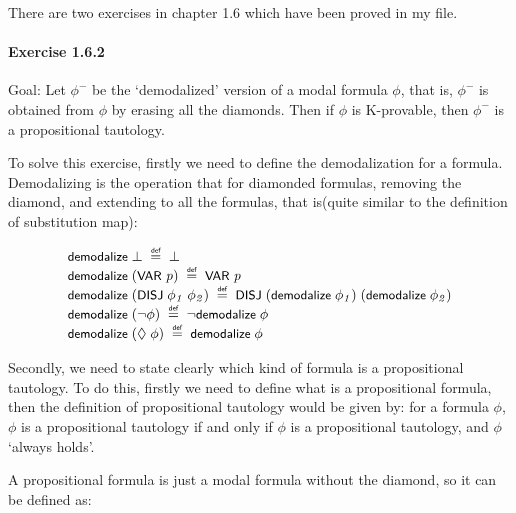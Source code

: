 \documentclass{report}
\renewcommand{\HOLConst}[1]{{\textsf{\upshape\small #1}}}
\newenvironment{holmath}{\begin{displaymath}\begin{array}{l}}{\end{array}\end{displaymath}\ignorespacesafterend}
\begin{document}
There are two exercises in chapter 1.6 which have been proved in my file.

\paragraph{Exercise 1.6.2}

Goal: Let $\phi^-$ be the `demodalized' version of a modal formula $\phi$, that is, $\phi^-$ is obtained from $\phi$ by erasing all the diamonds. Then if $\phi$ is K-provable, then $\phi^-$ is a propositional tautology.

To solve this exercise, firstly we need to define the demodalization for a formula. Demodalizing is the operation that for diamonded formulas, removing the diamond, and extending to all the formulas, that is(quite similar to the definition of substitution map):

\begin{holmath}
  \HOLConst{demodalize}\;\HOLSymConst{\ensuremath{\bot}}\;\HOLSymConst{\HOLTokenDefEquality{}}\;\HOLSymConst{\ensuremath{\bot}}\\
\HOLConst{demodalize}\;(\HOLConst{VAR}\;\HOLFreeVar{p})\;\HOLSymConst{\HOLTokenDefEquality{}}\;\HOLConst{VAR}\;\HOLFreeVar{p}\\
\HOLConst{demodalize}\;(\HOLConst{DISJ}\;\HOLFreeVar{\ensuremath{\phi\sb{1}}}\;\HOLFreeVar{\ensuremath{\phi\sb{2}}})\;\HOLSymConst{\HOLTokenDefEquality{}}\;\HOLConst{DISJ}\;(\HOLConst{demodalize}\;\HOLFreeVar{\ensuremath{\phi\sb{1}}})\;(\HOLConst{demodalize}\;\HOLFreeVar{\ensuremath{\phi\sb{2}}})\\
\HOLConst{demodalize}\;(\HOLSymConst{\HOLTokenNeg{}}\HOLFreeVar{\ensuremath{\phi}})\;\HOLSymConst{\HOLTokenDefEquality{}}\;\HOLSymConst{\HOLTokenNeg{}}\HOLConst{demodalize}\;\HOLFreeVar{\ensuremath{\phi}}\\
\HOLConst{demodalize}\;(\HOLSymConst{\ensuremath{\Diamond}}\;\HOLFreeVar{\ensuremath{\phi}})\;\HOLSymConst{\HOLTokenDefEquality{}}\;\HOLConst{demodalize}\;\HOLFreeVar{\ensuremath{\phi}}
\end{holmath}

Secondly, we need to state clearly which kind of formula is a propositional tautology. To do this, firstly we need to define what is a propositional formula, then the definition of propositional tautology would be given by: for a formula $\phi$, $\phi$ is a propositional tautology if and only if $\phi$ is a propositional tautology, and $\phi$ `always holds'.

A propositional formula is just a modal formula without the diamond, so it can be defined as:
\end{document}
